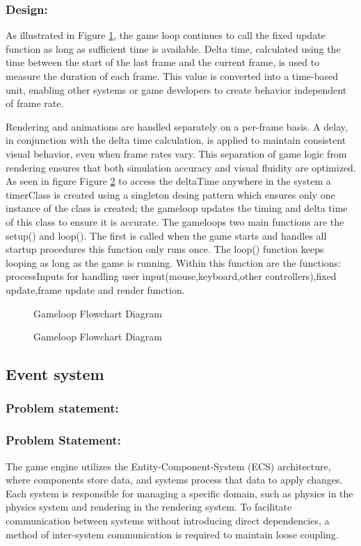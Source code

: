 \documentclass{projdoc}
\begin{document}
\subsubsection{Design:}
As illustrated in Figure \ref{gameloop-flow}, the game loop continues to call the fixed update function as long as sufficient time is available.
Delta time, calculated using the time between the start of the last frame and the current frame, is used to measure the duration of each frame. This value is converted into a time-based unit, enabling other systems or game developers to create behavior independent of frame rate.

Rendering and animations are handled separately on a per-frame basis. A delay, in conjunction with the delta time calculation, is applied to maintain consistent visual behavior, even when frame rates vary. This separation of game logic from rendering ensures that both simulation accuracy and visual fluidity are optimized.
As seen in figure Figure \ref{gameloop-class} to access the deltaTime anywhere in the system a timerClass is created using a singleton desing pattern which ensures only one instance of the class is created; the gameloop updates the timing and delta time of this class to ensure it is accurate.
The gameloops two main functions are the setup() and loop(). The first is called when the game starts and handles all startup procedures this function only runs once.
The loop() function keeps looping as long as the game is running. Within this function are the functions: processInputs for handling user input(mouse,keyboard,other controllers),fixed update,frame update and render function.
\begin{figure}
	\centering
	\caption{Gameloop Flowchart Diagram} \label{gameloop-flow}
\end{figure}

\begin{figure}
	\centering
	\caption{Gameloop Flowchart Diagram} \label{gameloop-class}
\end{figure}
\subsection{Event system}
\subsubsection{Problem statement:}
\subsubsection{Problem Statement:}
The game engine utilizes the Entity-Component-System (ECS) architecture, where components store data, and systems process that data to apply changes. Each system is responsible for managing a specific domain, such as physics in the physics system and rendering in the rendering system. To facilitate communication between systems without introducing direct dependencies, a method of inter-system communication is required to maintain loose coupling.
\end{document}
